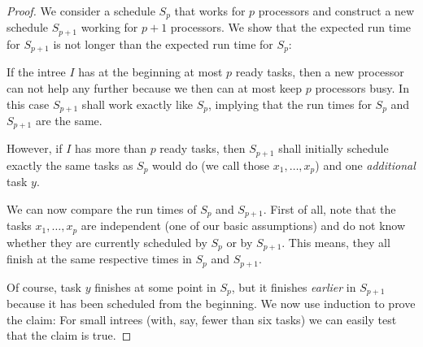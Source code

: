 \begin{proof}
  We consider a schedule $S_p$ that works for $p$ processors and construct a new schedule $S_{p+1}$ working for $p+1$ processors. We show that the expected run time for $S_{p+1}$ is not longer than the expected run time for $S_p$:

  If the intree $I$ has at the beginning at most $p$ ready tasks, then a new processor can not help any further because we then can at most keep $p$ processors busy. In this case $S_{p+1}$ shall work exactly like $S_p$, implying that the run times for $S_p$ and $S_{p+1}$ are the same.

  However, if $I$ has more than $p$ ready tasks, then $S_{p+1}$ shall initially schedule exactly the same tasks as $S_p$ would do (we call those $x_1,\dots,x_p$) and one \emph{additional} task $y$.

  We can now compare the run times of $S_p$ and $S_{p+1}$. First of all, note that the tasks $x_1,\dots,x_p$ are independent (one of our basic assumptions) and do not know whether they are currently scheduled by $S_p$ or by $S_{p+1}$. This means, they all finish at the same respective times in $S_p$ and $S_{p+1}$. 

  Of course, task $y$ finishes at some point in $S_p$, but it finishes \emph{earlier} in $S_{p+1}$ because it has been scheduled from the beginning. We now use induction to prove the claim: For small intrees (with, say, fewer than six tasks) we can easily test that the claim is true.



\end{proof}
